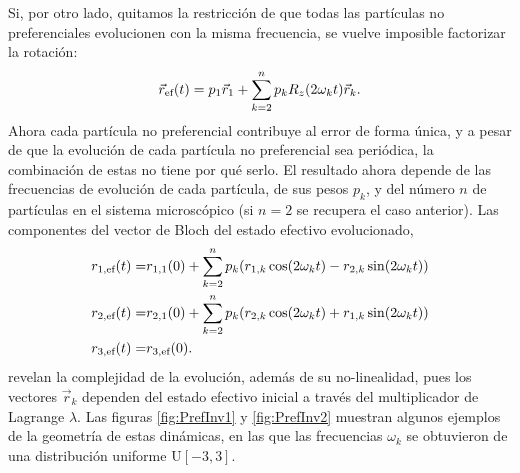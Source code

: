 Si, por otro lado, quitamos la restricción de que todas las partículas no preferenciales evolucionen con la misma frecuencia, se vuelve imposible factorizar la rotación:
\begin{equation}
    \vec{r}_{\text{ef}}(t)=p_{1}\vec{r}_{1}+\sum_{k=2}^{n} p_{k}R_{z}(2\omega_{k} t)\vec{r}_{k}.\nonumber
\end{equation}
Ahora cada partícula no preferencial contribuye al error de forma única, y a pesar de que la evolución de cada partícula no preferencial sea periódica, la combinación de estas no tiene por qué serlo. El resultado ahora depende de las frecuencias de evolución de cada partícula, de sus pesos $p_{k}$, y del número $n$ de partículas en el sistema microscópico (si $n=2$ se recupera el caso anterior). Las componentes del vector de Bloch del estado efectivo evolucionado,
\begin{align}
    r_{1,\text{ef}}(t)=&r_{1,1}(0)+\sum_{k=2}^{n}p_{k}(r_{1,k}\cos(2\omega_{k} t)-r_{2,k}\sin(2\omega_{k} t))\nonumber\\
    r_{2,\text{ef}}(t)=&r_{2,1}(0)+\sum_{k=2}^{n}p_{k}(r_{2,k}\cos(2\omega_{k} t)+r_{1,k}\sin(2\omega_{k} t))\nonumber\\
    r_{3,\text{ef}}(t)=&r_{3,\text{ef}}(0).\nonumber
\end{align}
revelan la complejidad de la evolución, además de su no-linealidad, pues los vectores $\vec{r}_{k}$ dependen del estado efectivo inicial a través del multiplicador de Lagrange $\lambda.$ Las figuras \ref{fig:PrefInv1} y \ref{fig:PrefInv2} muestran algunos ejemplos de la geometría de estas dinámicas, en las que las frecuencias $\omega_{k}$ se obtuvieron de una distribución uniforme $\text{U}[-3,3]$.


